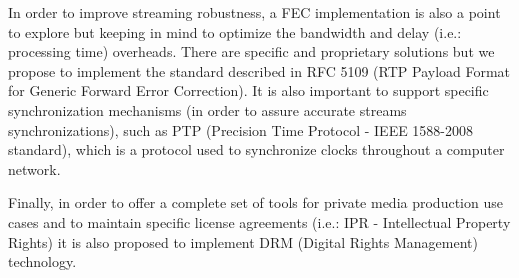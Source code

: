 In order to improve streaming robustness, a FEC implementation is also a point to explore but keeping in mind to optimize the bandwidth and delay (i.e.: processing time) overheads. There are specific and proprietary solutions but we propose to implement the standard described in RFC 5109 (RTP Payload Format for Generic Forward Error Correction). It is also important to  support specific synchronization mechanisms (in order to assure accurate streams synchronizations), such as PTP (Precision Time Protocol - IEEE 1588-2008 standard), which is a protocol used to synchronize clocks throughout a computer network.

\vbox{Finally, in order to offer a complete set of tools for private media production use cases and to maintain specific license agreements (i.e.: IPR - Intellectual Property Rights) it is also proposed to implement DRM (Digital Rights Management) technology.}
